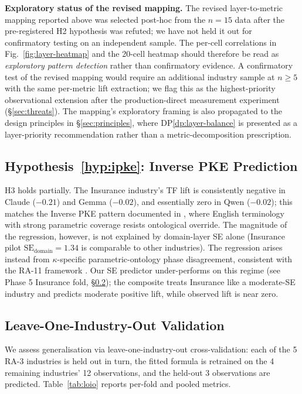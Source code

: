 \documentclass[11pt,a4paper]{article}
\newcommand{\se}{\mathrm{SE}}
\newcommand{\sedom}{\se_{\text{domain}}}
\newcommand{\kapp}{\kappa}
\begin{document}
\textbf{Exploratory status of the revised mapping.} The revised
layer-to-metric mapping reported above was selected post-hoc from the
$n = 15$ data after the pre-registered H2 hypothesis was refuted; we
have not held it out for confirmatory testing on an independent sample.
The per-cell correlations in Fig.~\ref{fig:layer-heatmap} and the
20-cell heatmap should therefore be read as \emph{exploratory pattern
detection} rather than confirmatory evidence. A confirmatory test of
the revised mapping would require an additional industry sample at
$n \geq 5$ with the same per-metric lift extraction; we flag this as
the highest-priority observational extension after the
production-direct measurement experiment (\S\ref{sec:threats}). The
mapping's exploratory framing is also propagated to the design
principles in \S\ref{sec:principles}, where DP\ref{dp:layer-balance}
is presented as a layer-priority recommendation rather than a
metric-decomposition prescription.

\subsection{Hypothesis~\ref{hyp:ipke}: Inverse PKE Prediction}

H3 holds partially. The Insurance industry's TF lift is consistently
negative in Claude ($-0.21$) and Gemma ($-0.02$), and essentially zero
in Qwen ($-0.02$); this matches the Inverse PKE pattern documented in
\citet{luong2026neurosymbolic}, where English terminology with strong
parametric coverage resists ontological override. The magnitude of the
regression, however, is not explained by domain-layer SE alone (Insurance
pilot $\sedom = 1.34$ is comparable to other industries). The regression
arises instead from $\kapp$-specific parametric-ontology phase
disagreement, consistent with the RA-11 framework
\citep{luong2026quantum}. Our SE predictor under-performs on this
regime (see Phase 5 Insurance fold, \S\ref{sec:holdout}); the composite
treats Insurance like a moderate-SE industry and predicts moderate
positive lift, while observed lift is near zero.

\subsection{Leave-One-Industry-Out Validation}
\label{sec:holdout}

We assess generalisation via leave-one-industry-out cross-validation:
each of the 5 RA-3 industries is held out in turn, the fitted
formula is retrained on the 4 remaining industries' 12 observations, and
the held-out 3 observations are predicted. Table~\ref{tab:loio} reports
per-fold and pooled metrics.
\end{document}
